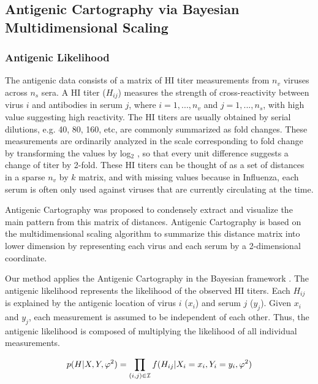 \documentclass[11pt,oneside,letterpaper]{article}
\newcommand{\mdssd}{\varphi}						%
\begin{document}
\subsection*{Antigenic Cartography via Bayesian Multidimensional Scaling}



\subsubsection*{Antigenic Likelihood }


The antigenic data consists of a matrix of HI titer measurements from $n_v$ viruses across $n_s$ sera.  
A HI titer ($H_{ij}$) measures the strength of cross-reactivity between virus $i$ and antibodies in serum $j$, where $i=1, ...,  n_v$ and $j=1,...,n_s$, with high value suggesting high reactivity. 
The HI titers are usually obtained by serial dilutions, e.g. 40, 80, 160, etc, are commonly summarized as fold changes. These measurements are ordinarily analyzed in the scale corresponding to fold change by transforming the values by log$_2$ \cite{smith_mapping_2004, bedford_integrating_2014}, so that every unit difference suggests a change of titer by 2-fold. 
These HI titers can be thought of as a set of distances in a sparse $n_v$ by $k$ matrix, and with missing values because in Influenza, each serum is often only used against viruses that are currently circulating at the time.
	
Antigenic Cartography was proposed \cite{smith_mapping_2004} to condensely extract and visualize the main pattern from this matrix of distances. 
Antigenic Cartography is based on the multidimensional scaling algorithm to summarize this distance matrix into lower dimension by representing each virus and each serum by a 2-dimensional coordinate. 

Our method applies the Antigenic Cartography in the Bayesian framework \cite{bedford_integrating_2014}. 
The antigenic likelihood represents the likelihood of the observed HI titers. 
Each $H_{ij}$ is explained by the antigenic location of virus $i$ ($x_i$) and serum $j$ ($y_j$). 
Given $x_i$ and $y_j$, each measurement is assumed to be independent of each other. 
Thus, the antigenic likelihood is composed of multiplying the likelihood of all individual measurements.

\begin{equation}
 p(H|X, Y, \mdssd^2) = \prod_{(i,j) \in \cal I} f(H_{ij} |  X_i  = x_i, Y_i = y_i,\mdssd^2) 
\end{equation}
\end{document}
